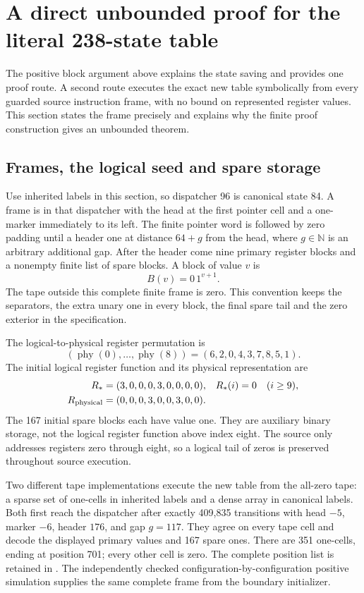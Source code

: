 \section{A direct unbounded proof for the literal 238-state table}
\label{sec:runtime}

The positive block argument above explains the state saving and provides
one proof route. A second route executes the exact new table symbolically
from every guarded source instruction frame, with no bound on represented
register values. This section states the frame precisely and explains
why the finite proof construction gives an unbounded theorem.

\subsection{Frames, the logical seed and spare storage}

Use inherited labels in this section, so dispatcher 96 is canonical state
84. A frame is in that dispatcher with the head at the first pointer
cell and a one-marker immediately to its left. The finite pointer word
is followed by zero padding until a header one at distance $64+g$ from
the head, where $g\in\mathbb N$ is an arbitrary additional gap. After the
header come nine primary register blocks and a nonempty finite list of
spare blocks. A block of value $v$ is
\[
                       B(v)=0\,1^{v+1}.
\]
The tape outside this complete finite frame is zero. This convention
keeps the separators, the extra unary one in every block, the final
spare tail and the zero exterior in the specification.

The logical-to-physical register permutation is
\[
   (\operatorname{phy}(0),\ldots,\operatorname{phy}(8))
                      =(6,2,0,4,3,7,8,5,1).
\]
The initial logical register function and its physical representation are
\begin{align*}
 R_*&=(3,0,0,0,3,0,0,0,0),& R_*(i)&=0\quad(i\geq9),\\
 R_{\rm physical}&=(0,0,0,3,0,0,3,0,0).
\end{align*}
The 167 initial spare blocks each have value one. They are auxiliary
binary storage, not the logical register function above index eight.
The source only addresses registers zero through eight, so a logical
tail of zeros is preserved throughout source execution.

Two different tape implementations execute the new table from the
all-zero tape: a sparse set of one-cells in inherited labels and a dense
array in canonical labels. Both first reach the dispatcher after exactly
409,835 transitions with head $-5$, marker $-6$, header $176$, and gap
$g=117$. They agree on every tape cell and decode the displayed primary
values and 167 spare ones. There are 351 one-cells, ending at position
701; every other cell is zero. The complete position list is retained in
. The independently checked
configuration-by-configuration positive simulation supplies the same
complete frame from the boundary initializer.

